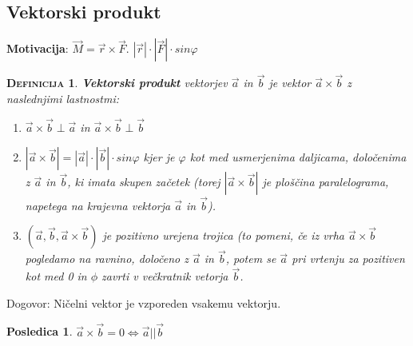 \documentclass[a4paper,12pt]{article}
\newtheorem*{posl}{Posledica}
\newtheorem*{definicija}{\textsc{Definicija}}
\begin{document}
\newpage 

\begin{center}
\subsection{Vektorski produkt}
\end{center}

\textbf{Motivacija}: $\vec{M} = \vec{r} \times \vec{F}.$ $|\vec{r}| \cdot |\vec{F}| \cdot sin\varphi $ \\

\begin{definicija}
\textbf{Vektorski produkt} vektorjev $\vec{a}$ in $\vec{b}$ je vektor $\vec{a} \times \vec{b}$ z naslednjimi lastnostmi:
\begin{enumerate}
\item  $\vec{a} \times \vec{b} \perp \vec{a}$ in $\vec{a} \times \vec{b} \perp \vec{b}$ 
\item $ |\vec{a} \times \vec{b}| = |\vec{a}| \cdot |\vec{b}| \cdot sin\varphi$ kjer je $\varphi$ kot med usmerjenima daljicama, določenima z $\vec{a}$ in $\vec{b}$, ki imata skupen začetek (torej $ |\vec{a} \times \vec{b}|$ je ploščina paralelograma, napetega na krajevna vektorja $\vec{a}$ in $\vec{b}$).
\item $(\vec{a}, \vec{b}, \vec{a} \times \vec{b})$ je pozitivno urejena trojica (to pomeni, če iz vrha $ \vec{a} \times \vec{b}$ pogledamo na ravnino, določeno z $\vec{a}$ in $\vec{b}$, potem se $\vec{a}$ pri vrtenju za pozitiven kot med 0 in $\phi$ zavrti v večkratnik vetorja $\vec{b}$.
\end{enumerate}
\end{definicija}

Dogovor: Ničelni vektor je vzporeden vsakemu vektorju. \\

\begin{posl}
$ \vec{a} \times \vec{b} = 0 \Leftrightarrow \vec{a} || \vec{b}$ \\
\end{posl}
\end{document}
